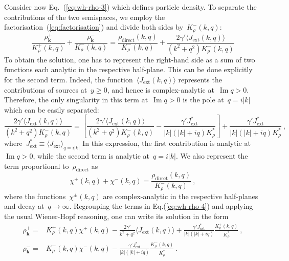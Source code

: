 \documentclass[preprint,aps,eqsecnum]{revtex4-1}
\newcommand{\fplus}[1]{{#1}^{+}}
\newcommand{\fminus}[1]{{#1}^{-}}
\newcommand{\fplusminus}[1]{{#1}^{\pm}}
\renewcommand{\Im}{\mathop{\mathrm{Im}}\nolimits}
\newcommand{\dct}[1]{{#1}_\mathrm{direct}}
\begin{document}
 Consider now Eq.~(\ref{eq:wh-rho-3}) which defines particle  density.
 To separate the contributions of the two semispaces, we employ
 the factorisation~(\ref{eq:factorisation}) and divide both sides
 by~$\fminus{K}_\rho(k, q)$:
 \begin{equation}
   \label{eq:wh-rho-4}
   \frac{\fplus{\rho}_{\bm k}}{\fplus{K}_\rho(k, q)}
    + \frac{\fminus{\rho}_{\bm k}}{\fminus{K}_\rho(k, q)}
    = \frac{\dct{\rho}(k, q)}{\fminus{K}_\rho(k, q)}
    + \frac{2 \gamma' \langle J_{\mathrm{ext}}(k, q) \rangle}{(k^2 + q^2)\fminus{K}_\rho(k, q)}
\end{equation}
To obtain the solution, one has to represent the right-hand side as a sum of
two functions each analytic in the respective half-plane. This can be done
explicitly for the second term. Indeed,
the function~$\langle J_{\mathrm{ext}}(k, q) \rangle$ represents
the contributions of sources at~$y \geq 0$, and hence is complex-analytic
at~$\Im q > 0$. Therefore, the only singularity in this term at~$\Im q > 0$
is the pole at~$q = i |k|$ which can be easily separated:
\begin{equation}
   \frac{2 \gamma' \langle J_{\mathrm{ext}}(k, q) \rangle}{(k^2 + q^2)\fminus{K}_\rho(k, q)}
   = \left[\frac{2 \gamma' \langle J_{\mathrm{ext}}(k, q) \rangle}{(k^2 + q^2)\fminus{K}_\rho(k, q)}  - \frac{\gamma' J_\mathrm{ext}^\ast}{|k|(|k| + i q) K_\rho^\ast}\right]
   + \frac{\gamma' J_\mathrm{ext}^\ast}{|k|(|k| + i q) K_\rho^\ast}
   \ ,
\end{equation}
where~$J_\mathrm{ext}^\ast \equiv \langle J_\mathrm{ext} \rangle_{q = i |k|}$
In this expression, the first contribution is analytic at~$\Im q > 0$, while
the second term is analytic at~$q = i |k|$. We also represent the term
proportional to~$\dct{\rho}$ as
\begin{equation}
  \label{eq:chi-def}
  \fplus{\chi}(k, q) + \fminus{\chi}(k, q)
  = \frac{\dct{\rho}(k, q)}{\fminus{K}_\rho(k, q)}
\ ,
\end{equation}
where the functions~$\fplusminus{\chi}(k, q)$ are complex-analytic
in the respective half-planes and decay at~$q \to \infty$. Regrouping
the terms in Eq.(\ref{eq:wh-rho-4}) and applying the usual Wiener-Hopf
reasoning, one can write its solution in the form
\begin{align}
  \label{eq:solution-rho-plus-0}
  \fplus{\rho}_{\bm k} ={}& \fplus{K}_\rho(k, q)  \fplus{\chi}(k, q)
   - \frac{2 \gamma'}{k^2 + q^2} \langle J_\mathrm{ext}(k, q) \rangle
   + \frac{\gamma'  J_\mathrm{ext}^\ast}{|k|(|k| + iq)}
     \frac{\fplus{K}_\rho(k, q)}{K_\rho^\ast}
   \ ,
   \\
   \label{eq:solution-rho-minus}
   \fminus{\rho}_{\bm k} = {}& \fminus{K}_\rho(k, q) \fminus{\chi}(k, q)
   - \frac{\gamma' J_\mathrm{ext}^\ast}{|k|(|k| + iq)}\frac{\fminus{K}_\rho(k, q)}{K_\rho^\ast}
   \ .
\end{align}
\end{document}
